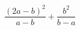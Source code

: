 \begin{ex}[type=expression]
	\begin{condition}
		\( \dfrac{(2a-b)^2}{a-b}+\dfrac{b^2}{b-a} \)
	\end{condition}
\end{ex}